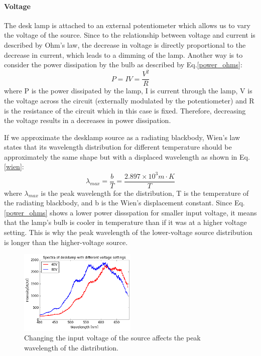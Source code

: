 \documentclass[authoryear,12pt,5p,times]{elsarticle}
\begin{document}
	\paragraph*{\textbf{Voltage}} The desk lamp is attached to an external potentiometer which allows us to vary the voltage of the source. Since to the relationship between voltage and current is described by Ohm's law, the decrease in voltage is directly proportional to the decrease in current, which  leads to a dimming of the lamp. Another way is to consider the power dissipation by the bulb as described by Eq.\ref{power_ohms}:
	\begin{equation}
	P=IV=\frac{V^2}{R}
	\label{power_ohms}
	\end{equation}
		where P is the power dissipated by the lamp, I is current through the lamp, V is the voltage across the circuit (externally modulated by the potentiometer) and R is the resistance of the circuit which in this case is fixed. Therefore, decreasing the voltage results in a decreases in power dissipation.
		
If we approximate the desklamp source as a radiating blackbody, Wien's law states that its wavelength distribution for different temperature should be approximately the same shape but with a displaced wavelength as shown in Eq.\ref{wien}:
		\begin{equation}
		\lambda_{max} = \frac{b}{T}=\frac{2.897\times 10^3 m\cdot K}{T}
		\label{wien}
		\end{equation}
		where $\lambda_{max}$ is the peak wavelength for the distribution, T is the temperature of the radiating blackbody, and b is the Wien's displacement constant.
		Since Eq. \ref{power_ohms} shows a lower power dissspation for smaller input voltage, it means that the lamp's bulb is cooler in temperature than if it was at a higher voltage setting. This is why the peak wavelength of the  lower-voltage source distribution is longer than the higher-voltage source. %
	\begin{figure}[h!]
	\includegraphics[width=0.5\textwidth]{figures/voltage}
\caption{Changing the input voltage of the source affects the peak wavelength of the distribution. }

\label{voltage}
	\end{figure}
\end{document}
